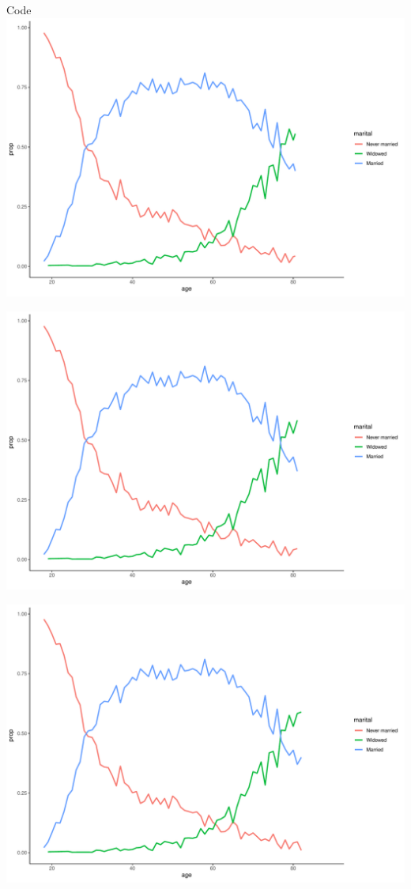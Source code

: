 \documentclass[
  ignorenonframetext,
]{beamer}
\begin{document}
\begin{frame}[fragile]{Code}
\includegraphics{gss_cat_files/figure-beamer/unnamed-chunk-1-92.pdf}

\includegraphics{gss_cat_files/figure-beamer/unnamed-chunk-1-93.pdf}

\includegraphics{gss_cat_files/figure-beamer/unnamed-chunk-1-94.pdf}


\end{frame}
\end{document}
